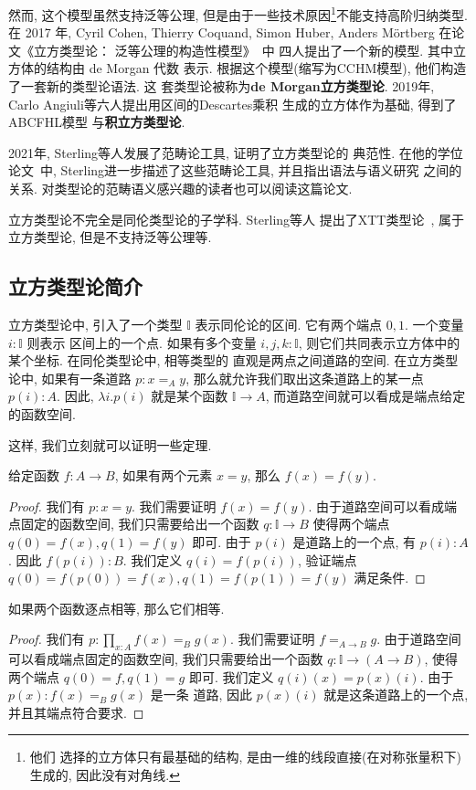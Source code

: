 然而, 这个模型虽然支持泛等公理, 但是由于一些技术原因\footnote{他们
选择的立方体只有最基础的结构, 是由一维的线段直接(在对称张量积下)生成的,
因此没有对角线.}不能支持高阶归纳类型. 在 2017 年,
Cyril Cohen, Thierry Coquand, Simon Huber, Anders M\"ortberg
在论文《立方类型论： 泛等公理的构造性模型》~\cite{abcfhl:2021:cubical}中
四人提出了一个新的模型. 其中立方体的结构由 de Morgan 代数
表示. 根据这个模型(缩写为CCHM模型), 他们构造了一套新的类型论语法. 这
套类型论被称为\textbf{de Morgan立方类型论}.
2019年, Carlo Angiuli等六人提出用区间的Descartes乘积
生成的立方体作为基础, 得到了ABCFHL模型
与\textbf{积立方类型论}.

2021年, Sterling等人发展了范畴论工具, 证明了立方类型论的
典范性. 在他的学位论文~\cite{sterling:2021:thesis}中,
Sterling进一步描述了这些范畴论工具, 并且指出语法与语义研究
之间的关系. 对类型论的范畴语义感兴趣的读者也可以阅读这篇论文.

立方类型论不完全是同伦类型论的子学科. Sterling等人
提出了XTT类型论~\cite{sterling:2019:xtt}, 属于立方类型论,
但是不支持泛等公理等.

\subsection{立方类型论简介}

立方类型论中, 引入了一个类型 \(\mathbb I\) 表示同伦论的区间.
它有两个端点 \(0,1\). 一个变量 \(i : \mathbb I\) 则表示
区间上的一个点. 如果有多个变量 \(i,j,k : \mathbb I\),
则它们共同表示立方体中的某个坐标. 在同伦类型论中, 相等类型的
直观是两点之间道路的空间. 在立方类型论中, 如果有一条道路
\(p : x =_A y\), 那么就允许我们取出这条道路上的某一点
\(p(i) : A\). 因此, \(\lambda i. p(i)\) 就是某个函数
\(\mathbb I \to A\), 而道路空间就可以看成是端点给定的函数空间.

这样, 我们立刻就可以证明一些定理.

\begin{theorem}
给定函数 \(f : A \to B\), 如果有两个元素 \(x = y\), 那么
\(f(x) = f(y)\).
\end{theorem}
\begin{proof}
我们有 \(p : x = y\). 我们需要证明 \(f(x) = f(y)\).
由于道路空间可以看成端点固定的函数空间, 我们只需要给出一个函数
\(q : \mathbb I \to B\) 使得两个端点 \(q(0) = f(x),
q(1) = f(y)\) 即可. 由于 \(p(i)\) 是道路上的一个点, 有
\(p(i) : A\). 因此 \(f(p(i)) : B\). 我们定义 \(q(i) = f(p(i))\),
验证端点 \(q(0) = f(p(0)) = f(x), q(1) = f(p(1)) = f(y)\)
满足条件.
\end{proof}

\begin{theorem}
如果两个函数逐点相等, 那么它们相等.
\end{theorem}
\begin{proof}
我们有 \(p : \prod_{x : A} f(x) =_B g(x)\). 我们需要证明
\(f =_{A\to B} g\). 由于道路空间可以看成端点固定的函数空间,
我们只需要给出一个函数 \(q : \mathbb I \to (A \to B)\), 使得
两个端点 \(q(0) = f, q(1) = g\) 即可. 我们定义
\(q(i)(x) = p(x)(i)\). 由于 \(p(x) : f(x) =_B g(x)\) 是一条
道路, 因此 \(p(x)(i)\) 就是这条道路上的一个点, 并且其端点符合要求.
\end{proof}

